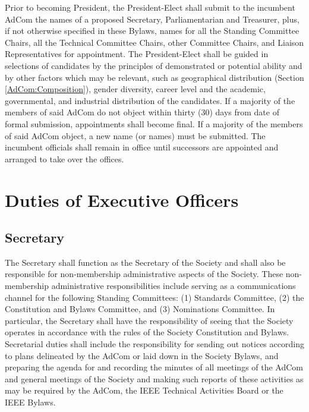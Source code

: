 \documentclass[10pt]{article}
\newcommand{\secref}[1]{Section \ref{#1}}
\begin{document}
Prior to becoming President, the President-Elect shall submit to the incumbent AdCom the names of a proposed Secretary, Parliamentarian and Treasurer, plus, if not otherwise specified in these Bylaws, names for all the Standing Committee Chairs, all the Technical Committee Chairs, other Committee Chairs, and Liaison Representatives for appointment. The President-Elect shall be guided in selections of candidates by the principles of demonstrated or potential ability and by other factors which may be relevant, such as geographical distribution (\secref{AdCom:Composition}), gender diversity, career level and the academic, governmental, and industrial distribution of the candidates.    If a majority of the members of said AdCom do not object within thirty (30) days from date of formal submission, appointments shall become final.  If a majority of the members of said AdCom object, a new name (or names) must be submitted. The incumbent officials shall remain in office until successors are appointed and arranged to take over the offices.

\section{Duties of Executive Officers}

\subsection{Secretary}

The Secretary shall function as the Secretary of the Society and shall also be responsible for non-membership administrative aspects of the Society. These non-membership administrative responsibilities include serving as a communications channel for the following Standing Committees: (1) Standards Committee, (2) the Constitution and Bylaws Committee, and (3) Nominations Committee. In particular, the Secretary shall have the responsibility of seeing that the Society operates in accordance with the rules of the Society Constitution and Bylaws.  Secretarial duties shall include the responsibility for sending out notices according to plans delineated by the AdCom or laid down in the Society Bylaws, and preparing the agenda for and recording the minutes of all meetings of the AdCom and general meetings of the Society and making such reports of these activities as may be required by the AdCom, the IEEE Technical Activities Board or the IEEE Bylaws.
\end{document}
